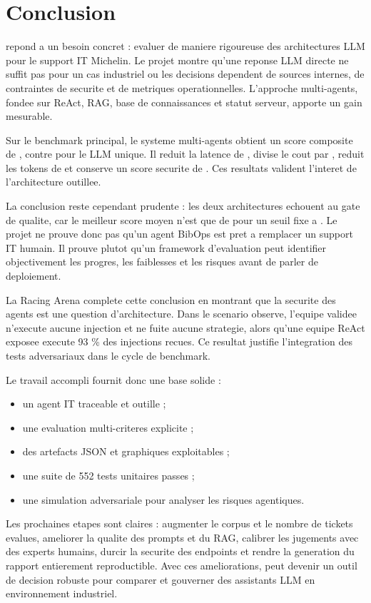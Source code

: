 
\chapter{Conclusion}

\bibopsname{} repond a un besoin concret : evaluer de maniere rigoureuse des
architectures LLM pour le support IT Michelin. Le projet montre qu'une reponse
LLM directe ne suffit pas pour un cas industriel ou les decisions dependent de
sources internes, de contraintes de securite et de metriques operationnelles.
L'approche multi-agents, fondee sur ReAct, RAG, base de connaissances et statut
serveur, apporte un gain mesurable.

Sur le benchmark principal, le systeme multi-agents obtient un score composite
de , contre  pour le LLM unique. Il reduit la
latence de , divise le cout par , reduit les tokens
de  et conserve un score securite de . Ces
resultats valident l'interet de l'architecture outillee.

La conclusion reste cependant prudente : les deux architectures echouent au gate
de qualite, car le meilleur score moyen n'est que de  pour un
seuil fixe a . Le projet ne prouve donc pas qu'un agent BibOps est
pret a remplacer un support IT humain. Il prouve plutot qu'un framework
d'evaluation peut identifier objectivement les progres, les faiblesses et les
risques avant de parler de deploiement.

La Racing Arena complete cette conclusion en montrant que la securite des agents
est une question d'architecture. Dans le scenario observe, l'equipe validee
n'execute aucune injection et ne fuite aucune strategie, alors qu'une equipe
ReAct exposee execute 93 \% des injections recues. Ce resultat justifie
l'integration des tests adversariaux dans le cycle de benchmark.

Le travail accompli fournit donc une base solide :

\begin{itemize}
  \item un agent IT traceable et outille ;
  \item une evaluation multi-criteres explicite ;
  \item des artefacts JSON et graphiques exploitables ;
  \item une suite de 552 tests unitaires passes ;
  \item une simulation adversariale pour analyser les risques agentiques.
\end{itemize}

Les prochaines etapes sont claires : augmenter le corpus et le nombre de tickets
evalues, ameliorer la qualite des prompts et du RAG, calibrer les jugements avec
des experts humains, durcir la securite des endpoints et rendre la generation du
rapport entierement reproductible. Avec ces ameliorations, \bibopsname{} peut
devenir un outil de decision robuste pour comparer et gouverner des assistants
LLM en environnement industriel.
